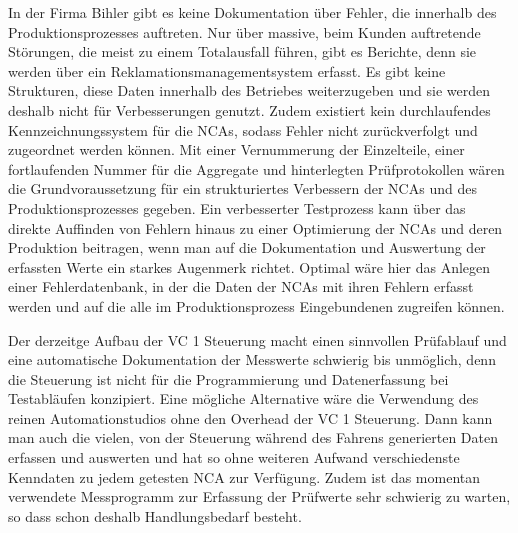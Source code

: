In der Firma Bihler gibt es keine Dokumentation über Fehler, die innerhalb des Produktionsprozesses auftreten. Nur über massive, beim Kunden auftretende Störungen, die meist zu einem Totalausfall führen, gibt es Berichte, denn sie werden über ein Reklamationsmanagementsystem erfasst. Es gibt keine Strukturen, diese Daten innerhalb des Betriebes weiterzugeben und sie werden deshalb nicht für Verbesserungen genutzt. Zudem existiert kein durchlaufendes Kennzeichnungssystem für die NCAs, sodass Fehler nicht zurückverfolgt und zugeordnet werden können. Mit einer Vernummerung der Einzelteile, einer fortlaufenden Nummer für die Aggregate und hinterlegten Prüfprotokollen wären die Grundvoraussetzung für ein strukturiertes Verbessern der NCAs und des Produktionsprozesses gegeben. Ein verbesserter Testprozess kann über das direkte Auffinden von Fehlern hinaus zu einer Optimierung der NCAs und deren Produktion beitragen, wenn man auf die Dokumentation und Auswertung der erfassten Werte ein starkes Augenmerk richtet. Optimal wäre hier das Anlegen einer Fehlerdatenbank, in der die Daten der NCAs mit ihren Fehlern erfasst werden und auf die alle im Produktionsprozess Eingebundenen zugreifen können.


Der derzeitge Aufbau der VC 1 Steuerung macht einen sinnvollen Prüfablauf und eine automatische Dokumentation der Messwerte schwierig bis unmöglich, denn die Steuerung ist nicht für die Programmierung und Datenerfassung bei Testabläufen konzipiert. Eine mögliche Alternative wäre die Verwendung des reinen Automationstudios ohne den Overhead der VC 1 Steuerung. Dann kann man auch die vielen, von der Steuerung während des Fahrens generierten Daten erfassen und auswerten und hat so ohne weiteren Aufwand verschiedenste Kenndaten zu jedem getesten NCA zur Verfügung. Zudem ist das momentan verwendete Messprogramm zur Erfassung der Prüfwerte sehr schwierig zu warten, so dass schon deshalb Handlungsbedarf besteht.







